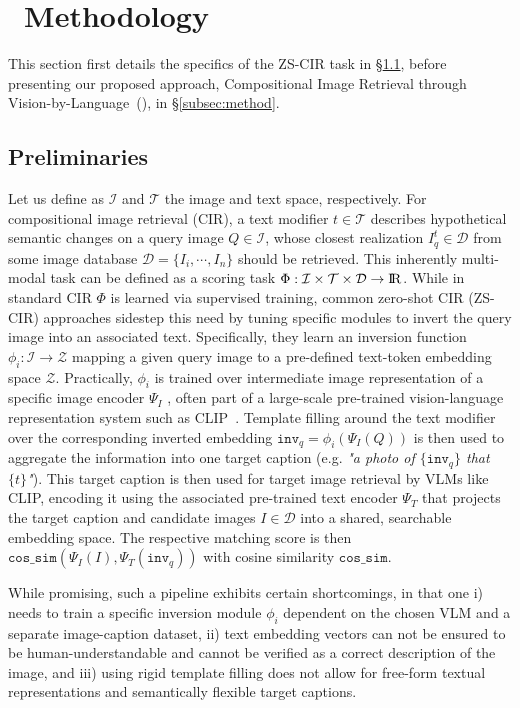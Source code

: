 \documentclass{article} \usepackage{iclr2024_conference,times}
\newcommand{\acronym}{{Compositional Image Retrieval through Vision-by-Language}}
\begin{document}
\section{\methodNameNS \ Methodology}
\label{sec:method}
This section first details the specifics of the ZS-CIR task in \S\ref{subsec:prelims}, before presenting our proposed approach, \acronym\ (\methodNameNS), in \S\ref{subsec:method}.

\subsection{Preliminaries}
\label{subsec:prelims}
Let us define as $\mathcal{I}$  and $\mathcal{T}$ the image and text space, respectively. 
For compositional image retrieval (CIR), a text modifier $t\in\mathcal{T}$ describes hypothetical semantic changes on a query image $Q \in \mathcal{I}$, whose closest realization $I_q^t\in\mathcal{D}$ from some image database $\mathcal{D} = \{I_i, \cdots, I_n\}$ should be retrieved.
This inherently multi-modal task can be defined as a scoring task $\Phi: \mathcal{I}\times \mathcal{T} \times \mathcal{D} \rightarrow {\rm I\!R}$. 
While in standard CIR $\Phi$ is learned via supervised training, common zero-shot CIR (ZS-CIR) approaches sidestep this need by tuning specific modules to invert the query image into an associated text. 
Specifically, they learn an inversion function $\phi_i:\mathcal{I}\rightarrow\mathcal{Z}$ mapping a given query image to a pre-defined text-token embedding space $\mathcal{Z}$. 
Practically, $\phi_i$ is trained over intermediate image representation of a specific image encoder $\Psi_I$ \citep{pic2word,searle}, often part of a large-scale pre-trained vision-language representation system such as CLIP~\citep{clip}.
Template filling around the text modifier over the corresponding inverted embedding $\mathtt{inv}_q = \phi_i(\Psi_I(Q))$ is then used to aggregate the information into one target caption (e.g. \textit{"a photo of $\{\mathtt{inv}_q\}$ that $\{t\}$"}). 
This target caption is then used for target image retrieval by VLMs like CLIP, encoding it using the associated pre-trained text encoder $\Psi_T$ that projects the target caption and candidate images $I\in\mathcal{D}$ into a shared, searchable embedding space.
The respective matching score is then $\mathtt{cos\_sim}(\Psi_I(I), \Psi_T(\mathtt{inv}_q))$ with cosine similarity $\mathtt{cos\_sim}$.

While promising, such a pipeline exhibits certain shortcomings, in that one 
i) needs to train a specific inversion module $\phi_i$ dependent on the chosen VLM and a separate image-caption dataset, 
ii) text embedding vectors can not be ensured to be human-understandable and cannot be verified as a correct description of the image, and 
iii) using rigid template filling does not allow for free-form textual representations and semantically flexible target captions.  
\end{document}
